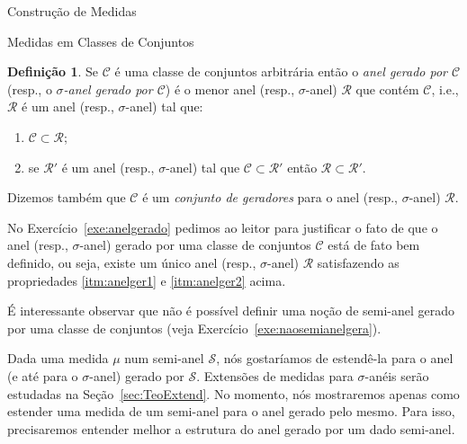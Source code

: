 \documentclass[oneside,final,11pt]{amsbook}
\theoremstyle{remark}\newtheorem{exercise}{Exercício}[chapter]
\theoremstyle{remark}\newtheorem{*exercise}[exercise]{\hbox to 0pt{\hskip 0pt minus 1fil*}Exercício}
\theoremstyle{definition}\newtheorem{exdefin}{Definição}[chapter]
\theoremstyle{plain}\newtheorem{teo}{Teorema}[section]
\theoremstyle{plain}\newtheorem{lem}[teo]{Lema}
\theoremstyle{plain}\newtheorem{prop}[teo]{Proposição}
\theoremstyle{plain}\newtheorem{cor}[teo]{Corolário}
\theoremstyle{definition}\newtheorem{defin}[teo]{Definição}
\theoremstyle{remark}\newtheorem{rem}[teo]{Observação}
\theoremstyle{definition}\newtheorem{notation}[teo]{Notação}
\theoremstyle{definition}\newtheorem{convention}[teo]{Convenção}
\theoremstyle{definition}\newtheorem{example}[teo]{Exemplo}
\numberwithin{section}{chapter}
\numberwithin{equation}{section}
\begin{document}
\begin{chapter}{Construção de Medidas}
\begin{section}{Medidas em Classes de Conjuntos}
\begin{defin}\label{thm:anelgerado}
Se $\mathcal C$ é uma classe de conjuntos arbitrária então o {\em anel gerado por $\mathcal C$\/} (resp., o {\em $\sigma$-anel gerado por $\mathcal C$}) é o menor anel (resp., $\sigma$-anel) $\mathcal R$ que contém $\mathcal C$, i.e., $\mathcal R$ é um anel
(resp., $\sigma$-anel) tal que:
\begin{enumerate}
\item\label{itm:anelger1} $\mathcal C\subset\mathcal R$;
\item\label{itm:anelger2} se $\mathcal R'$ é um anel (resp., $\sigma$-anel) tal que $\mathcal C\subset\mathcal R'$ então
$\mathcal R\subset\mathcal R'$.
\end{enumerate}
Dizemos também que $\mathcal C$ é um {\em conjunto de geradores\/}%
para o anel (resp., $\sigma$-anel) $\mathcal R$.
\end{defin}
No Exercício~\ref{exe:anelgerado} pedimos ao leitor para justificar o fato de que o anel (resp., $\sigma$-anel)
gerado por uma classe de conjuntos $\mathcal C$ está de fato bem definido,
ou seja, existe um único anel (resp., $\sigma$-anel) $\mathcal R$ satisfazendo as propriedades \eqref{itm:anelger1}
e \eqref{itm:anelger2} acima.

É interessante observar que não é possível definir uma noção de semi-anel gerado por uma classe de conjuntos
(veja Exercício~\ref{exe:naosemianelgera}).

Dada uma medida $\mu$ num semi-anel $\mathcal S$, nós gostaríamos de estendê-la para o anel (e até para o $\sigma$-anel)
gerado por $\mathcal S$. Extensões de medidas para $\sigma$-anéis serão estudadas na Seção~\ref{sec:TeoExtend}.
No momento, nós mostraremos apenas como estender uma medida de um semi-anel para o anel gerado pelo mesmo.
Para isso, precisaremos entender melhor a estrutura do anel gerado por um dado semi-anel.


\end{section}
\end{chapter}
\end{document}
